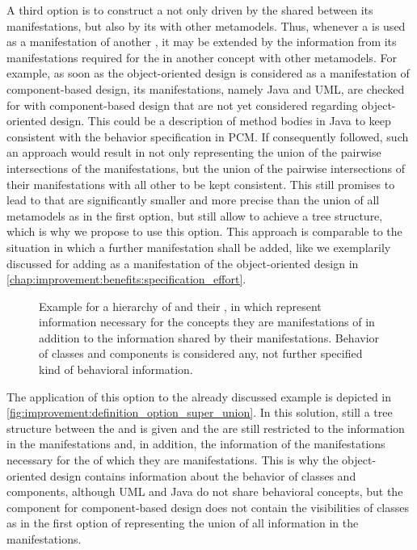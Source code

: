 A third option is to construct a \conceptmetamodel not only driven by the \commonalities shared between its manifestations, but also by its \commonalities with other metamodels.
Thus, whenever a \conceptmetamodel is used as a manifestation of another \conceptmetamodel, it may be extended by the information from its manifestations required for the \commonalities in another concept with other metamodels.
For example, as soon as the object-oriented design \conceptmetamodel is considered as a manifestation of component-based design, its manifestations, namely Java and \gls{UML}, are checked for \commonalities with component-based design that are not yet considered \commonalities regarding object-oriented design.
This could be a description of method bodies in Java to keep consistent with the behavior specification in \gls{PCM}.
If consequently followed, such an approach would result in \conceptmetamodels not only representing the union of the pairwise intersections of the manifestations, but the union of the pairwise intersections of their manifestations with all other \concretemetamodels to be kept consistent.
This still promises to lead to \conceptmetamodels that are significantly smaller and more precise than the union of all metamodels as in the first option, but still allow to achieve a tree structure, which is why we propose to use this option.
This approach is comparable to the situation in which a further manifestation shall be added, like we exemplarily discussed for adding \cplusplus as a manifestation of the object-oriented design \conceptmetamodel in \autoref{chap:improvement:benefits:specification_effort}.

\begin{figure}
    \centering
    
    \caption[\Commonalities including information of their concepts]{Example for a hierarchy of \conceptmetamodels and their \commonalities, in which \commonalities represent information necessary for the concepts they are manifestations of in addition to the information shared by their manifestations. Behavior of classes and components is considered any, not further specified kind of behavioral information.}
    \label{fig:improvement:definition_option_super_union}
\end{figure}

The application of this option to the already discussed example is depicted in \autoref{fig:improvement:definition_option_super_union}.
In this solution, still a tree structure between the \metaclasses and \commonalities is given and the \conceptmetamodels are still restricted to the information in the manifestations and, in addition, the information of the manifestations necessary for the \conceptmetamodels of which they are manifestations.
This is why the object-oriented design \conceptmetamodel contains information about the behavior of classes and components, although \gls{UML} and Java do not share behavioral concepts, but the component \commonality for component-based design does not contain the visibilities of classes as in the first option of representing the union of all information in the manifestations.


